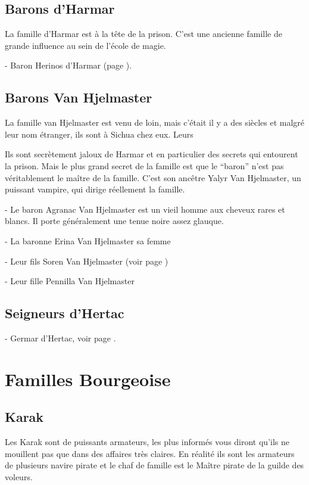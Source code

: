\subsection*{Barons d'Harmar}

La famille d'Harmar est à la tête de la prison. C'est une ancienne famille de 
grande influence au sein de l'école de magie.

- Baron Herinos d'Harmar (page \pageref{ErinosdHarmar}).

\subsection*{Barons Van Hjelmaster}

La famille van Hjelmaster est venu de loin, mais c'était il y a des 
siècles et malgré leur nom étranger, ils sont à Sichua chez eux. Leurs

Ils sont secrètement jaloux de Harmar et en particulier des secrets
qui entourent la prison. Mais le plus grand secret de la famille est
que le ``baron'' n'est pas véritablement le maître de la famille. C'est
son ancêtre Yalyr Van Hjelmaster, un puissant vampire, qui dirige réellement
la famille.

- Le baron Agranac Van Hjelmaster est un vieil homme aux cheveux rares
et blancs. Il porte généralement une tenue noire assez glauque. 

- La baronne Erina Van Hjelmaster sa femme

- Leur fils Soren Van Hjelmaster (voir page \pageref{SorenVH})

- Leur fille Pennilla Van Hjelmaster

\subsection*{Seigneurs d'Hertac}

 - Germar d'Hertac, voir page \pageref{GermardHertac}. 

\section{Familles Bourgeoise}

\subsection*{Karak}

Les Karak sont de puissants armateurs, les plus informés vous diront qu'ils
ne mouillent pas que dans des affaires très claires. En réalité ils sont les
armateurs de plusieurs navire pirate et le chaf de famille est le Maître pirate
de la guilde des voleurs.

